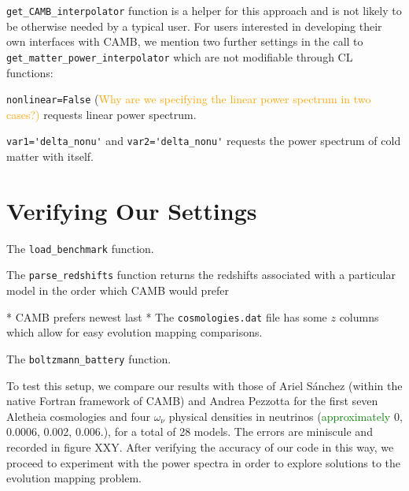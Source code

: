 \verb|get_CAMB_interpolator| function is a helper for this approach and is not 
likely to be otherwise needed by a typical user. For users interested in
developing their own interfaces with CAMB, we mention two further
settings in the call to \verb|get_matter_power_interpolator| which are not
modifiable through CL functions:

\verb|nonlinear=False| (\textcolor{orange}{Why are we specifying the linear
power spectrum in two cases?)} \quad requests linear power spectrum.

\verb|var1='delta_nonu'| and \verb|var2='delta_nonu'| requests the power
spectrum of cold matter with itself.


\section{Verifying Our Settings}
\label{sec: CAMB_validation}


The \verb|load_benchmark| function.

The \verb|parse_redshifts| function returns the redshifts associated with a
particular model in the order which CAMB would prefer

* CAMB prefers newest last
* The \verb|cosmologies.dat| file has some $z$ columns which allow for easy
evolution mapping comparisons. %

The \verb|boltzmann_battery| function.


To test this setup, we compare our results with those of Ariel S\'{a}nchez 
(within the native Fortran framework of CAMB) and Andrea Pezzotta for the
first seven Aletheia cosmologies and four $\omega_\nu$ physical densities in
neutrinos (\textcolor{green}{approximately} 0, 0.0006, 0.002, 0.006.), for a 
total of 28
models. The errors are miniscule and recorded in figure XXY. After verifying
the accuracy of our code in this way, we proceed to experiment with the power
spectra in order to explore solutions to the evolution mapping problem.


